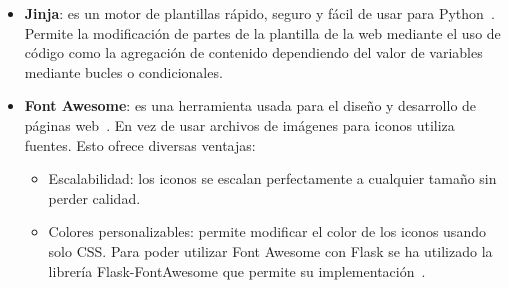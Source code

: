 \begin{itemize}
\begin{itemize}
\end{itemize}
\item \textbf{Jinja}: es un motor de plantillas rápido, seguro y fácil de usar para Python~\cite{jinja}. Permite la modificación de partes de la plantilla de la web mediante el uso de código como la agregación de contenido dependiendo del valor de variables mediante bucles o condicionales.
\item \textbf{Font Awesome}: es una herramienta usada para el diseño y desarrollo de páginas web~\cite{fontawesome}. En vez de usar archivos de imágenes para iconos utiliza fuentes. Esto ofrece diversas ventajas:
\begin{itemize}
\item Escalabilidad: los iconos se escalan perfectamente a cualquier tamaño sin perder calidad.
\item Colores personalizables: permite modificar el color de los iconos usando solo CSS.
Para poder utilizar Font Awesome con Flask se ha utilizado la librería Flask-FontAwesome que permite su implementación~\cite{flaskfontawesome}.
\end{itemize}
\end{itemize}